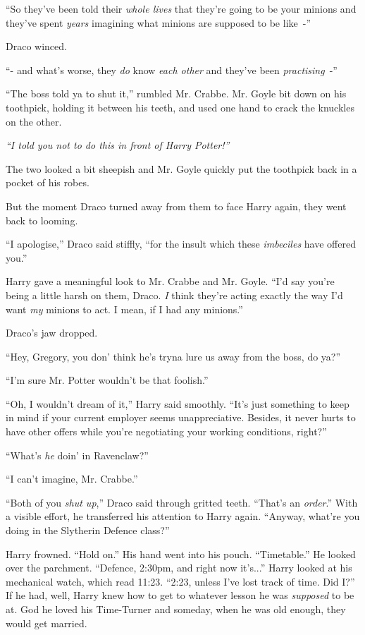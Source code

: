 ``So they've been told their \emph{whole lives} that they're going to be your minions and they've spent \emph{years} imagining what minions are supposed to be like~-''

Draco winced.

``- and what's worse, they \emph{do} know \emph{each other} and they've been \emph{practising}~-''

``The boss told ya to shut it,'' rumbled Mr. Crabbe. Mr. Goyle bit down on his toothpick, holding it between his teeth, and used one hand to crack the knuckles on the other.

\emph{``I told you not to do this in front of Harry Potter!''}

The two looked a bit sheepish and Mr. Goyle quickly put the toothpick back in a pocket of his robes.

But the moment Draco turned away from them to face Harry again, they went back to looming.

``I apologise,'' Draco said stiffly, ``for the insult which these \emph{imbeciles} have offered you.''

Harry gave a meaningful look to Mr. Crabbe and Mr. Goyle. ``I'd say you're being a little harsh on them, Draco. \emph{I} think they're acting exactly the way I'd want \emph{my} minions to act. I mean, if I had any minions.''

Draco's jaw dropped.

``Hey, Gregory, you don' think he's tryna lure us away from the boss, do ya?''

``I'm sure Mr. Potter wouldn't be that foolish.''

``Oh, I wouldn't dream of it,'' Harry said smoothly. ``It's just something to keep in mind if your current employer seems unappreciative. Besides, it never hurts to have other offers while you're negotiating your working conditions, right?''

``What's \emph{he} doin' in Ravenclaw?''

``I can't imagine, Mr. Crabbe.''

``Both of you \emph{shut up},'' Draco said through gritted teeth. ``That's an \emph{order}.'' With a visible effort, he transferred his attention to Harry again. ``Anyway, what're you doing in the Slytherin Defence class?''

Harry frowned. ``Hold on.'' His hand went into his pouch. ``Timetable.'' He looked over the parchment. ``Defence, 2:30pm, and right now it's...'' Harry looked at his mechanical watch, which read 11:23. ``2:23, unless I've lost track of time. Did I?'' If he had, well, Harry knew how to get to whatever lesson he was \emph{supposed} to be at. God he loved his Time-Turner and someday, when he was old enough, they would get married.

